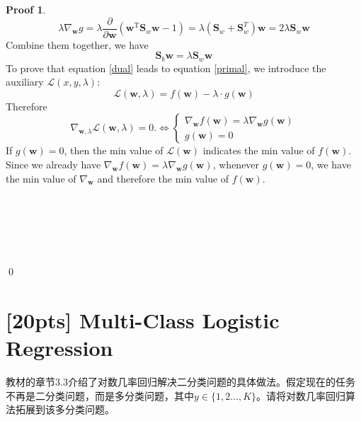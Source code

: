 \documentclass[a4paper,UTF8]{article}
\numberwithin{equation}{section}
\theoremstyle{definition}
\newtheorem*{prove}{Proof}
\begin{document}
\begin{prove}
 \begin{equation}
 \lambda \nabla_{ \mathbf{w}} g = \lambda \frac{ \partial}{\partial\mathbf{w} }  (  \mathbf{w}^\mathrm{T} \mathbf{S}_w\mathbf{w} - 1) =\lambda (\mathbf{S}_w+ \mathbf{S}_w^T) \mathbf{w} = 2  \lambda\mathbf{S}_w \mathbf{w}
 \end{equation}
Combine them together, we have 
  \begin{equation}
  \mathbf{S}_b\mathbf{w} = \lambda \mathbf{S}_w\mathbf{w}
   \end{equation}
To prove that  equation \eqref{dual} leads to equation \eqref{primal},  we  introduce the auxiliary $\mathcal{L}(x,y,\lambda)$: 
 \begin{equation} 
\mathcal{L}(\mathbf{w},\lambda) = f(\mathbf{w}) - \lambda \cdot g(\mathbf{w})
 \end{equation}
Therefore
  \begin{equation} 
 \nabla_{\mathbf{w}, \lambda} \mathcal{L}(\mathbf{w}, \lambda)=0.\iff
 \begin{cases}
\nabla_{\mathbf{w}} f(\mathbf{w}) = \lambda \nabla_{\mathbf{w}} g(\mathbf{w})\\
 g(\mathbf{w}) = 0
\end{cases}
 \end{equation}
 If  $g(\mathbf{w}) = 0$, then the min value of $ \mathcal{L}(\mathbf{w})$ indicates the min value of $f(\mathbf{w})$. 
Since we already have $\nabla_{\mathbf{w}} f(\mathbf{w}) = \lambda \nabla_{\mathbf{w}} g(\mathbf{w})$, whenever $g(\mathbf{w}) = 0$, we have the min value of $\nabla_{\mathbf{w}} $ and therefore the min value of $f(\mathbf{w})$.
 


~\\
~\\
~\\
~\\
~\\
\qed
\end{prove}

\section{[20pts] Multi-Class Logistic Regression}
教材的章节3.3介绍了对数几率回归解决二分类问题的具体做法。假定现在的任务不再是二分类问题，而是多分类问题，其中$y\in\{1,2\dots,K\}$。请将对数几率回归算法拓展到该多分类问题。
\end{document}
